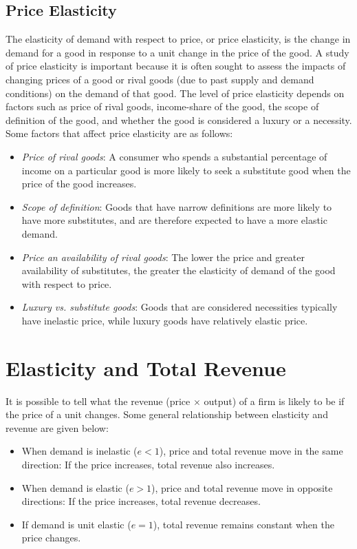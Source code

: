 \subsection{Price Elasticity}
The elasticity of demand with respect to price, or price elasticity, is the change in demand for a good in response to a unit change in the price of the good. A study of price elasticity is important because it is often sought to assess the impacts of changing prices of a good or rival goods (due to past supply and demand conditions) on the demand of that good. The level of price elasticity depends on factors such as price of rival goods, income-share of the good, the scope of definition of the good, and whether the good is considered a luxury or a necessity. Some factors that affect price elasticity are as follows:
\begin{itemize}
	\item \textit{Price of rival goods}: A consumer who spends a substantial percentage of income on a particular good is
	more likely to seek a substitute good when the price of the good increases.
	\item \textit{Scope of definition}: Goods that have narrow definitions are more likely to have more substitutes, and are therefore expected to have a more elastic demand.
	\item \textit{Price an availability of rival goods}: The lower the price and greater availability of substitutes, the greater the elasticity of demand of the good with respect to price.
	\item \textit{Luxury vs. substitute goods}: Goods that are considered necessities typically have inelastic price, while luxury goods have relatively elastic price.
\end{itemize}
%
\section{Elasticity and Total Revenue}
It is possible to tell what the revenue (price $\times$ output) of a firm is likely to be if the price of a unit changes. Some general relationship between elasticity and revenue are given below:
\begin{itemize}
	\item When demand is inelastic ($e < 1$), price and total revenue move in the same direction: If the price increases, total revenue also increases.
	\item When demand is elastic ($e > 1$), price and total revenue move in opposite directions: If the price increases, total revenue decreases.
	\item If demand is unit elastic ($ e = 1$), total revenue remains constant when the price changes.
\end{itemize}
%
